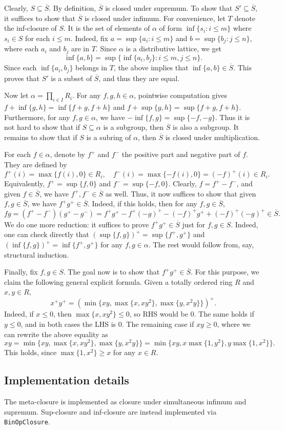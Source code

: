Clearly, $S \subseteq \overline{S}$.
By definition, $\overline{S}$ is closed under supremum.
To show that $S' \subseteq \overline{S}$, it suffices to show that $\overline{S}$ is closed under infimum.
For convenience, let $T$ denote the inf-closure of $S$.
It is the set of elements of $\alpha$ of form $\inf\{s_i : i \leq m\}$ where $s_i \in S$ for each $i \leq m$.
Indeed, fix $a = \sup\{a_i : i \leq m\}$ and $b = \sup\{b_j : j \leq n\}$, where each $a_i$ and $b_j$ are in $T$.
Since $\alpha$ is a distributive lattice, we get
\[ \inf\{a, b\} = \sup\{\inf\{a_i, b_j\} : i \leq m, j \leq n\}. \]
Since each $\inf\{a_i, b_j\}$ belongs in $T$, the above implies that $\inf\{a, b\} \in \overline{S}$.
This proves that $S'$ is a subset of $\overline{S}$, and thus they are equal.

Now let $\alpha = \prod_{i \in I} R_i$.
For any $f, g, h \in \alpha$, pointwise computation gives $f + \inf\{g, h\} = \inf\{f + g, f + h\}$ and $f + \sup\{g, h\} = \sup\{f + g, f + h\}$.
Furthermore, for any $f, g \in \alpha$, we have $-\inf\{f, g\} = \sup\{-f, -g\}$.
Thus it is not hard to show that if $S \subseteq \alpha$ is a subgroup, then $\overline{S}$ is also a subgroup.
It remains to show that if $S$ is a subring of $\alpha$, then $\overline{S}$ is closed under multiplication.

For each $f \in \alpha$, denote by $f^+$ and $f^-$ the positive part and negative part of $f$.
They are defined by
\[ f^+(i) = \max\{f(i), 0\} \in R_i, \quad f^-(i) = \max\{-f(i), 0\} = (-f)^+(i) \in R_i. \]
Equivalently, $f^+ = \sup\{f, 0\}$ and $f^- = \sup\{-f, 0\}$.
Clearly, $f = f^+ - f^-$, and given $f \in \overline{S}$, we have $f^+, f^- \in \overline{S}$ as well.
Thus, it now suffices to show that given $f, g \in \overline{S}$, we have $f^+ g^+ \in \overline{S}$.
Indeed, if this holds, then for any $f, g \in \overline{S}$,
\[ fg = (f^+ - f^-)(g^+ - g^-) = f^+ g^+ - f^+ (-g)^+ - (-f)^+ g^+ + (-f)^+ (-g)^+ \in \overline{S}. \]
We do one more reduction: it suffices to prove $f^+ g^+ \in \overline{S}$ just for $f, g \in S$.
Indeed, one can check directly that $(\sup\{f, g\})^+ = \sup\{f^+, g^+\}$ and $(\inf\{f, g\})^+ = \inf\{f^+, g^+\}$ for any $f, g \in \alpha$.
The rest would follow from, say, structural induction.

Finally, fix $f, g \in S$.
The goal now is to show that $f^+ g^+ \in \overline{S}$.
For this purpose, we claim the following general explicit formula.
Given a totally ordered ring $R$ and $x, y \in R$,
\[ x^+ y^+ = (\min\{xy, \max\{x, xy^2\}, \max\{y, x^2 y\}\})^+. \]
Indeed, if $x \leq 0$, then $\max\{x, xy^2\} \leq 0$, so RHS would be $0$.
The same holds if $y \leq 0$, and in both cases the LHS is $0$.
The remaining case if $xy \geq 0$, where we can rewrite the above equality as
\[ xy = \min\{xy, \max\{x, xy^2\}, \max\{y, x^2 y\}\} = \min\{xy, x \max\{1, y^2\}, y \max\{1, x^2\}\}. \]
This holds, since $\max\{1, x^2\} \geq x$ for any $x \in R$.



\subsection*{Implementation details}

The meta-closure is implemented as closure under simultaneous infimum and supremum.
Sup-closure and inf-closure are instead implemented via \texttt{BinOpClosure}.

